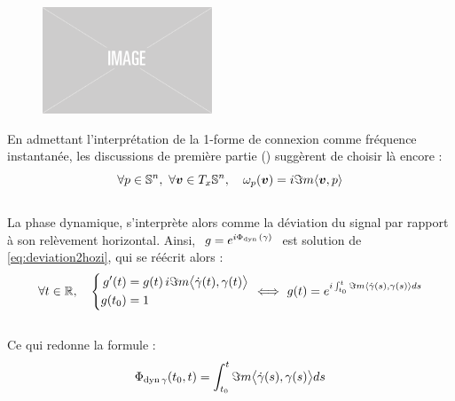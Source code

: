 \begin{figure}[h]
	\begin{floatrow}		
			{\includegraphics[width=0.45\textwidth]{fig/placeholder}}
			
	\end{floatrow}
\end{figure}

En admettant l'interprétation de la 1-forme de connexion comme fréquence instantanée, les discussions de première partie () suggèrent de choisir là encore :
\begin{equation} \label{eq:conn2SUPC}
	\forall p\in\S{n},\ \forall \bf{v}\in\tg[x]{\S{n}},\quad \conn_p(\bf{v}) = i\Im m \langle \bf{v}, p\rangle
\end{equation}
\\
La phase dynamique, s'interprète alors comme la déviation du signal par rapport à son relèvement horizontal. Ainsi, $\ g = e^{i\phased(\gamma)}\ $ est solution de \eqref{eq:deviation2hozi}, qui se réécrit alors :
\[\forall t\in\R,\quad \left\{ \begin{aligned}
	g'(t)  &= g(t)\, i\Im m \big\langle \dot{\gamma}(t) , \gamma(t) \big\rangle \\
	g(t_0) &= 1
\end{aligned}\ \right. \Llr\ g(t) = e^{i \int_{t_0}^t \Im m\langle \dot{\gamma}(s) , \gamma(s) \rangle ds}\]
\\
Ce qui redonne la formule :
\begin{equation}\label{eq:phased_vgeodiff}
	\phased[\gamma](t_0, t) = \int_{t_0}^t \Im m\big\langle \dot{\gamma}(s) , \gamma(s) \big\rangle ds
\end{equation}
\skipl

